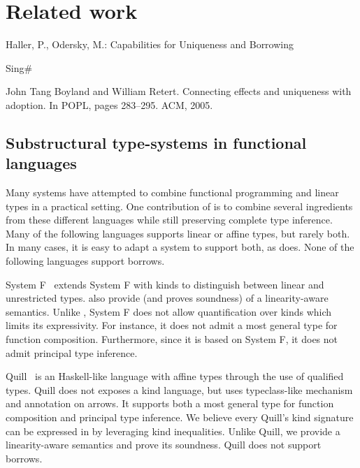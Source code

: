 \section{Related work}

Haller, P., Odersky, M.: Capabilities for Uniqueness and Borrowing
\cite{DBLP:conf/ecoop/HallerO10}

Sing\#

John Tang Boyland and William Retert. Connecting effects and
uniqueness with adoption. In POPL, pages 283–295. ACM, 2005.
\cite{DBLP:conf/popl/BoylandR05}


\subsection{Substructural type-systems in functional languages}

Many systems have attempted to combine
functional programming and linear types in a practical setting.
One contribution of \lang is to combine several ingredients
from these different languages while still preserving
complete type inference.
Many of the following languages supports linear or affine types, but rarely
both. In many cases, it is easy to adapt a system to support both, as
\lang does.
None of the following languages support borrows.

System F\degree~\citep{DBLP:conf/tldi/MazurakZZ10}
extends System F with kinds to distinguish
between linear and unrestricted types.
\citet{DBLP:conf/tldi/MazurakZZ10} also provide
(and proves soundness) of a linearity-aware semantics.
Unlike \lang, System F\degree{} does not allow
quantification over kinds which limits its expressivity. For instance, it
does not admit a most general type for function composition.
Furthermore, since it is based on System F, it does not admit
principal type inference.

Quill~\citep{DBLP:conf/icfp/Morris16} is an Haskell-like language with affine
types through the use of qualified types.
Quill does not exposes a kind language, but
uses typeclass-like mechanism and annotation on arrows.
It supports both a most general type for function composition and
principal type inference.
We believe every Quill's kind signature can be expressed in \lang by leveraging
kind inequalities.
Unlike Quill,
we provide a linearity-aware semantics and prove its soundness.
Quill does not support borrows.


